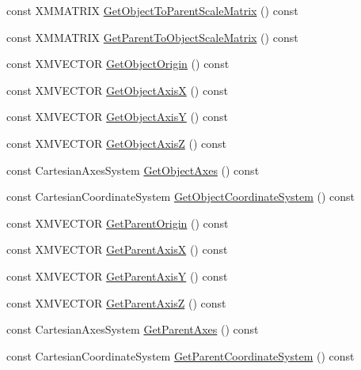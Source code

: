 \begin{DoxyCompactItemize}
\item 
const X\+M\+M\+A\+T\+R\+IX \hyperlink{classmage_1_1_transform_node_a36cbdebf999dc41871446f12c129041d}{Get\+Object\+To\+Parent\+Scale\+Matrix} () const
\item 
const X\+M\+M\+A\+T\+R\+IX \hyperlink{classmage_1_1_transform_node_a99da2ec9e52fdfc1e9279f1e3fc2fc15}{Get\+Parent\+To\+Object\+Scale\+Matrix} () const
\item 
const X\+M\+V\+E\+C\+T\+OR \hyperlink{classmage_1_1_transform_node_adc1edf6bde3772904073b360f17a65d2}{Get\+Object\+Origin} () const
\item 
const X\+M\+V\+E\+C\+T\+OR \hyperlink{classmage_1_1_transform_node_a6a6375218a90d18163aeec59d91a68e2}{Get\+Object\+AxisX} () const
\item 
const X\+M\+V\+E\+C\+T\+OR \hyperlink{classmage_1_1_transform_node_a807df3821f17d6b7ce1f7ca5a56b552d}{Get\+Object\+AxisY} () const
\item 
const X\+M\+V\+E\+C\+T\+OR \hyperlink{classmage_1_1_transform_node_a425c9ba06004d1de35ca97813524882a}{Get\+Object\+AxisZ} () const
\item 
const Cartesian\+Axes\+System \hyperlink{classmage_1_1_transform_node_aa6d5feb41f6e6d1582d26721ba537fdb}{Get\+Object\+Axes} () const
\item 
const Cartesian\+Coordinate\+System \hyperlink{classmage_1_1_transform_node_aa293ee88682b0d4ca6f5d7d6439595aa}{Get\+Object\+Coordinate\+System} () const
\item 
const X\+M\+V\+E\+C\+T\+OR \hyperlink{classmage_1_1_transform_node_ac22e00fc9d96642bf96bcbb121d685ab}{Get\+Parent\+Origin} () const
\item 
const X\+M\+V\+E\+C\+T\+OR \hyperlink{classmage_1_1_transform_node_a64aae2ae63bc53791d3febed5a51f989}{Get\+Parent\+AxisX} () const
\item 
const X\+M\+V\+E\+C\+T\+OR \hyperlink{classmage_1_1_transform_node_a67b78520c247ac38d853481e76e144c8}{Get\+Parent\+AxisY} () const
\item 
const X\+M\+V\+E\+C\+T\+OR \hyperlink{classmage_1_1_transform_node_ae165746ea0907f39429608b06d4c57af}{Get\+Parent\+AxisZ} () const
\item 
const Cartesian\+Axes\+System \hyperlink{classmage_1_1_transform_node_aac33c894481ee82a5a0af2a4aeb2b9f8}{Get\+Parent\+Axes} () const
\item 
const Cartesian\+Coordinate\+System \hyperlink{classmage_1_1_transform_node_aff2b422a7d240d4d2278f2960e18b3bf}{Get\+Parent\+Coordinate\+System} () const
\item 

\end{DoxyCompactItemize}

